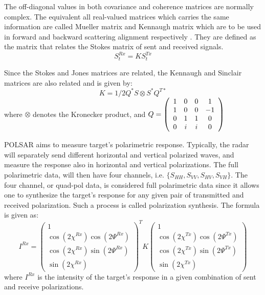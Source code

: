 The off-diagonal values in both covariance and coherence matrices are normally complex. 
The equivalent all real-valued matrices which carries the same information are called Mueller matrix and Kennaugh matrix which are to be used in forward and backward scattering alignment respectively \cite{Guissard_1994_TGRS}. 
They are defined as the matrix that relates the Stokes matrix of sent and received signals.
\begin{equation}
S_t^{Rx} = K S_t^{Tx}
\end{equation}

Since the Stokes and Jones matrices are related, the Kennaugh and Sinclair matrices are also related and is given by:
\begin{equation}
K = 1/2 Q^* S \otimes S^* Q^{T*}
\end{equation}
where
	$\otimes$ denotes the Kronecker product, and
	$Q = 
\left( 
\begin{array}{c c c c}
 1 & 0 & 0 &  1 \\
 1 & 0 & 0 & -1\\
 0 & 1 & 1 &  0\\
 0 & i & i &  0
\end{array}
\right)$ 

POLSAR aims to measure target's polarimetric response.
Typically, the radar will separately send different horizontal and vertical polarized waves, and measure the response also in horizontal and vertical polarizations.
The full polarimetric data, will then have four channels, i.e. $\{ S_{HH}, S_{VV}, S_{HV}, S_{VH} \}$. 
The four channel, or quad-pol data, is considered full polarimetric data since it allows one to synthesize the target's response for any given pair of transmitted and received polarization.
Such a process is called polarization synthesis.
The formula is given as:
\begin{equation}
I^{Rx} = 
\left( 
\begin{array}{c }
 1 \\
 \cos(2\chi^{Rx}) \cos(2\Psi^{Rx}) \\
 \cos(2\chi^{Rx}) \sin(2\Psi^{Rx}) \\
 \sin(2\chi^{Rx}) 
\end{array}
\right)^T
K
\left( 
\begin{array}{c }
 1 \\
 \cos(2\chi^{Tx}) \cos(2\Psi^{Tx}) \\
 \cos(2\chi^{Tx}) \sin(2\Psi^{Tx}) \\
 \sin(2\chi^{Tx}) 
\end{array}
\right)
\end{equation}
where $I^{Rx}$ is the intensity of the target's response in a given combination of sent and receive polarizations.

